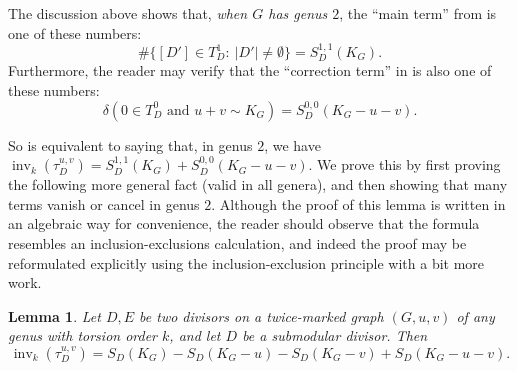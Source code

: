 \documentclass[11pt]{article}
\newtheorem{lemma}[theo]{Lemma}
\theoremstyle{definition}
\numberwithin{equation}{section}
\newcommand{\inv}{\operatorname{inv}}
\newcommand{\tauD}{\tau^{u,v}_D}
\begin{document}
The discussion above shows that, \emph{when $G$ has genus $2$}, the ``main term'' from  is one of these numbers: 
$$
\# \{ [D'] \in T^1_D:\ |D'| \neq \emptyset \} = S^{1,1}_D(K_G).
$$
Furthermore, the reader may verify that the ``correction term'' in  is also one of these numbers:
$$
\delta( 0 \in T^0_D \mbox{ and } u+v \sim K_G) = S^{0,0}_D(K_G-u-v).
$$

So  is equivalent to saying that, in genus $2$, we have $\inv_k(\tauD) = S^{1,1}_D(K_G) + S^{0,0}_D(K_G-u-v)$. We prove this by first proving the following more general fact (valid in all genera), and then showing that many terms vanish or cancel in genus $2$. Although the proof of this lemma is written in an algebraic way for convenience, the reader should observe that the formula resembles an inclusion-exclusions calculation, and indeed the proof may be reformulated explicitly using the inclusion-exclusion principle with a bit more work.

\begin{lemma}
\label{lem:invtauGeneral}
Let $D,E$ be two divisors on a twice-marked graph $(G,u,v)$ of any genus with torsion order $k$, and let $D$ be a submodular divisor. Then
$$
\inv_k(\tauD) = S_D(K_G) - S_D(K_G-u) - S_D(K_G-v) + S_D(K_G-u-v).
$$
\end{lemma}
\end{document}
